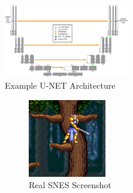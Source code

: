 \documentclass[10pt,twocolumn,letterpaper]{article}
\begin{document}
\begin{figure}[H]
   \centering
   \includegraphics[width=0.485\textwidth]{figures/unet.png}
   \caption{Example U-NET Architecture}
   \label{fig:unet}
\end{figure}
% 

\begin{figure}[H]
   \centering
   \begin{subfigure}[b]{0.225\textwidth}
      \includegraphics[width=\textwidth]{figures/snes_to_nes/AV_Mahjong_Club_(J)_(Unl)_copy__ucc__8_real_B.png}
      \caption{Real SNES Screenshot}
      \label{fig:ss1a}
   \end{subfigure}
   \begin{subfigure}[b]{0.225\textwidth}

\end{subfigure}
\end{figure}
\end{document}
